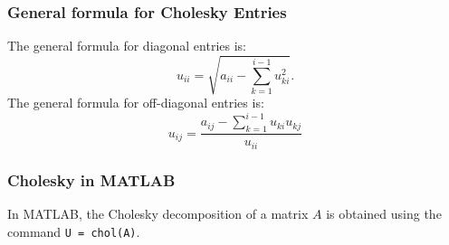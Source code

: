 \documentclass[12pt]{beamer}
\theoremstyle{definition}
\begin{document}
\begin{frame}
\frametitle{General formula for Cholesky Entries}

The general formula for diagonal entries is:
\[ u_{ii} = \sqrt{a_{ii} - \sum_{k =1}^{i-1} u_{ki}^2}. \]
The general formula for off-diagonal entries is:
\[ u_{ij} = \dfrac{a_{ij} - \sum_{k=1}^{i-1} u_{ki}u_{kj}}{u_{ii}}\]
\end{frame}

\begin{frame}
\frametitle{Cholesky in MATLAB}

In MATLAB, the Cholesky decomposition of a matrix $A$ is obtained
using the command {\tt U =  chol(A)}.
\end{frame}
\end{document}

